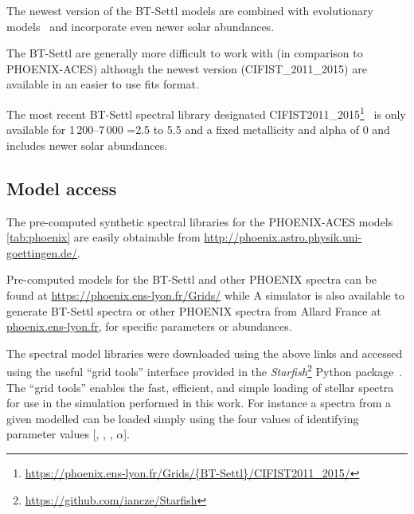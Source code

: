 The newest version of the {BT-Settl} models are combined with evolutionary models~\citep{barrafe_new_2015} and incorporate even newer \citet{caffau_solar_2011} solar abundances.

The {BT-Settl} are generally more difficult to work with (in comparison to PHOENIX-ACES) although the newest version (CIFIST\_2011\_2015) are  available in an easier to use fits format.





The most recent {BT-Settl} spectral library designated CIFIST2011\_2015\footnote{\url{https://phoenix.ens-lyon.fr/Grids/{BT-Settl}/CIFIST2011_2015/}}~\citep{baraffe_new_2015} is only available for 1\,200--7\,000\K{} \logg{}=2.5 to 5.5 and a fixed metallicity and alpha of 0 and includes newer \citet{caffau_solar_2011} solar abundances.


\subsection{Model access}
\label{subsec:model_access}
The pre-computed synthetic spectral libraries for the PHOENIX-ACES models \cref{tab:phoenix} are easily obtainable from \href{http://phoenix.astro.physik.uni-goettingen.de/}{http://phoenix.astro.physik.uni-goettingen.de/}.

Pre-computed models for the {BT-Settl} and other PHOENIX spectra can be found  at \href{https://phoenix.ens-lyon.fr/Grids/}{https://phoenix.ens-lyon.fr/Grids/} while 
A simulator is also available to generate {BT-Settl} spectra or other {PHOENIX} spectra from {Allard France} at \href{phoenix.ens-lyon.fr}{phoenix.ens-lyon.fr}, for specific parameters or abundances.

The spectral model libraries were downloaded using the above links and accessed using the useful ``grid tools'' interface provided in the \emph{Starfish}\footnote{\url{https://github.com/iancze/Starfish}} Python package~\citep{czekala_constructing_2015}. The ``grid tools'' enables the fast, efficient, and simple loading of stellar spectra for use in the simulation performed in this work. For instance a spectra from a given modelled can be loaded simply using the four values of identifying parameter values [\txteff, \logg, \feh, $\alpha$].


